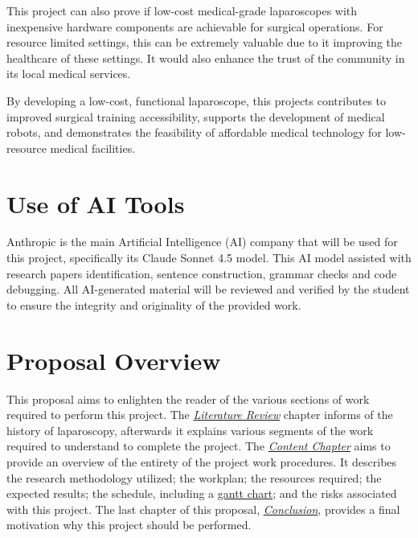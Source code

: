 \vspace{0.5cm}
\noindent
This project can also prove if low-cost medical-grade laparoscopes with inexpensive hardware components are achievable for surgical operations. For resource limited settings, this can be extremely valuable due to it improving the healthcare of these settings. It would also enhance the trust of the community in its local medical services.

\vspace{0.5cm}
\noindent
By developing a low-cost, functional laparoscope, this projects contributes to improved surgical training accessibility, supports the development of medical robots, and demonstrates the feasibility of affordable medical technology for low-resource medical facilities.

\section{Use of AI Tools}

Anthropic is the main Artificial Intelligence (AI) company that will be used for this project, specifically its Claude Sonnet 4.5 model. This AI model assisted with research papers identification, sentence construction, grammar checks and code debugging. All AI-generated material will be reviewed and verified by the student to ensure the integrity and originality of the provided work. 

\section{Proposal Overview}

This proposal aims to enlighten the reader of the various sections of work required to perform this project. The \textit{\hyperref[sec:Literature Review]{Literature Review}} chapter informs of the history of laparoscopy, afterwards it explains various segments of the work required to understand to complete the project. The \textit{\hyperref[sec:Content Chapter]{Content Chapter}} aims to provide an overview of the entirety of the project work procedures. It describes the research methodology utilized; the workplan; the resources required; the expected results; the schedule, including a \hyperref[fig:gantt]{gantt chart}; and  the risks associated with this project. The last chapter of this proposal, \textit{\hyperref[sec:Conclusion]{Conclusion}}, provides a final motivation why this project should be performed.